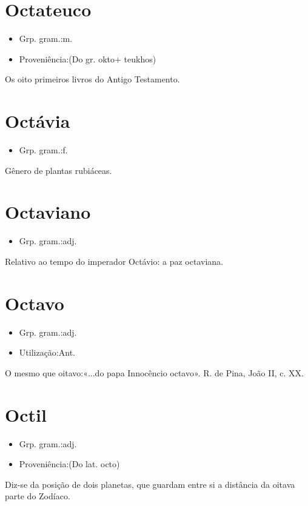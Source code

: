 \section{Octateuco}
\begin{itemize}
\item {Grp. gram.:m.}
\end{itemize}
\begin{itemize}
\item {Proveniência:(Do gr. \textunderscore okto\textunderscore  + \textunderscore teukhos\textunderscore )}
\end{itemize}
Os oito primeiros livros do \textunderscore Antigo Testamento\textunderscore .
\section{Octávia}
\begin{itemize}
\item {Grp. gram.:f.}
\end{itemize}
Gênero de plantas rubiáceas.
\section{Octaviano}
\begin{itemize}
\item {Grp. gram.:adj.}
\end{itemize}
Relativo ao tempo do imperador Octávio: \textunderscore a paz octaviana\textunderscore .
\section{Octavo}
\begin{itemize}
\item {Grp. gram.:adj.}
\end{itemize}
\begin{itemize}
\item {Utilização:Ant.}
\end{itemize}
O mesmo que \textunderscore oitavo\textunderscore :«\textunderscore ...do papa Innocêncio octavo\textunderscore ». R. de Pina, \textunderscore João II\textunderscore , c. XX.
\section{Octil}
\begin{itemize}
\item {Grp. gram.:adj.}
\end{itemize}
\begin{itemize}
\item {Proveniência:(Do lat. \textunderscore octo\textunderscore )}
\end{itemize}
Diz-se da posição de dois planetas, que guardam entre si a distância da oitava parte do Zodíaco.
